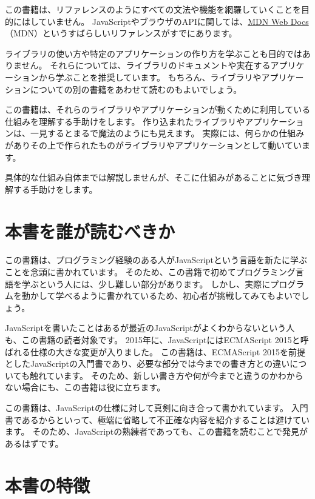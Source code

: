 この書籍は、リファレンスのようにすべての文法や機能を網羅していくことを目的にはしていません。
JavaScriptやブラウザのAPIに関しては、\href{https://developer.mozilla.org/ja/}{MDN
Web Docs}（MDN）というすばらしいリファレンスがすでにあります。

ライブラリの使い方や特定のアプリケーションの作り方を学ぶことも目的ではありません。
それらについては、ライブラリのドキュメントや実在するアプリケーションから学ぶことを推奨しています。
もちろん、ライブラリやアプリケーションについての別の書籍をあわせて読むのもよいでしょう。

この書籍は、それらのライブラリやアプリケーションが動くために利用している仕組みを理解する手助けをします。
作り込まれたライブラリやアプリケーションは、一見するとまるで魔法のようにも見えます。
実際には、何らかの仕組みがありその上で作られたものがライブラリやアプリケーションとして動いています。

具体的な仕組み自体までは解説しませんが、そこに仕組みがあることに気づき理解する手助けをします。

\hypertarget{who-read}{%
\section*{本書を誰が読むべきか}\label{who-read}}

この書籍は、プログラミング経験のある人がJavaScriptという言語を新たに学ぶことを念頭に書かれています。
そのため、この書籍で初めてプログラミング言語を学ぶという人には、少し難しい部分があります。
しかし、実際にプログラムを動かして学べるように書かれているため、初心者が挑戦してみてもよいでしょう。

JavaScriptを書いたことはあるが最近のJavaScriptがよくわからないという人も、この書籍の読者対象です。
2015年に、JavaScriptにはECMAScript
2015と呼ばれる仕様の大きな変更が入りました。 この書籍は、ECMAScript
2015を前提としたJavaScriptの入門書であり、必要な部分では今までの書き方との違いについても触れています。
そのため、新しい書き方や何が今までと違うのかわからない場合にも、この書籍は役に立ちます。

この書籍は、JavaScriptの仕様に対して真剣に向き合って書かれています。
入門書であるからといって、極端に省略して不正確な内容を紹介することは避けています。
そのため、JavaScriptの熟練者であっても、この書籍を読むことで発見があるはずです。

\hypertarget{features}{%
\section*{本書の特徴}\label{features}}

